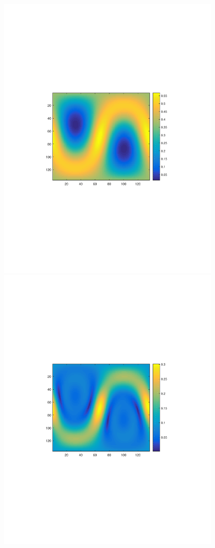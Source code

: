\documentclass{UCF_ETD}
\begin{document}
\begin{figure}[H]
\begin{center}
\includegraphics[scale=0.41]{RobustRegistration/SphericalImage2Rotated}
\includegraphics[scale=0.41]{RobustRegistration/SphericalImage3Rotated}

\end{center}
\end{figure}
\end{document}
